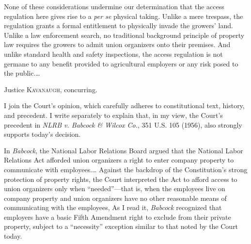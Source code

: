 None of these considerations undermine our determination that the access
regulation here gives rise to a \textit{per se} physical taking. Unlike a mere
trespass, the regulation grants a formal entitlement to physically invade the
growers' land. Unlike a law enforcement search, no traditional background
principle of property law requires the growers to admit union organizers onto
their premises. And unlike standard health and safety inspections, the access
regulation is not germane to any benefit provided to agricultural employers or
any risk posed to the public.\ldots

\opinion Justice \textsc{Kavanaugh}, concurring.

I join the Court's opinion, which carefully adheres to constitutional text,
history, and precedent. I write separately to explain that, in my view, the
Court's precedent in \textit{NLRB v. Babcock \& Wilcox Co.}, 351 U.S. 105
(1956), also strongly supports today's decision.


In \textit{Babcock}, the National Labor Relations Board argued that the National
Labor Relations Act afforded union organizers a right to enter company property
to communicate with employees.\ldots
%
%
Against the backdrop of the Constitution's
strong protection of property rights, the Court interpreted the Act to afford
access to union organizers only when ``needed''---that is, when the employees
live on company property and union organizers have no other reasonable means of
communicating with the employees, As I read it, \textit{Babcock} recognized that
employers have a basic Fifth Amendment right to exclude from their private
property, subject to a ``necessity'' exception similar to that noted by the
Court today. 

